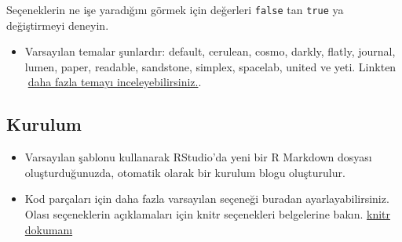 \documentclass[
  oneside]{book}
\newenvironment{Shaded}{\begin{snugshade}}{\end{snugshade}}
\newcommand{\AttributeTok}[1]{\textcolor[rgb]{0.13,0.29,0.53}{#1}}
\newcommand{\ConstantTok}[1]{\textcolor[rgb]{0.56,0.35,0.01}{#1}}
\newcommand{\DecValTok}[1]{\textcolor[rgb]{0.00,0.00,0.81}{#1}}
\newcommand{\FunctionTok}[1]{\textcolor[rgb]{0.13,0.29,0.53}{\textbf{#1}}}
\newcommand{\NormalTok}[1]{#1}
\newcommand{\SpecialCharTok}[1]{\textcolor[rgb]{0.81,0.36,0.00}{\textbf{#1}}}
\newcommand{\StringTok}[1]{\textcolor[rgb]{0.31,0.60,0.02}{#1}}
\providecommand{\tightlist}{%
  \setlength{\itemsep}{0pt}\setlength{\parskip}{0pt}}
\begin{document}
\begin{info}
Seçeneklerin ne işe yaradığını görmek için değerleri \texttt{false} tan \texttt{true} ya değiştirmeyi deneyin.

\end{info}

\begin{itemize}
\tightlist
\item
  Varsayılan temalar şunlardır: default, cerulean, cosmo, darkly, flatly, journal, lumen, paper, readable, sandstone, simplex, spacelab, united ve yeti. Linkten 🔗\href{https://rpubs.com/ranydc/rmarkdown_themes}{daha fazla temayı inceleyebilirsiniz.}.
\end{itemize}

\hypertarget{kurulum}{%
\subsection{Kurulum}\label{kurulum}}

\begin{itemize}
\tightlist
\item
  Varsayılan şablonu kullanarak RStudio'da yeni bir R Markdown dosyası oluşturduğunuzda, otomatik olarak bir kurulum blogu oluşturulur.
\end{itemize}

\begin{Shaded}
\end{Shaded}

\begin{itemize}
\tightlist
\item
  Kod parçaları için daha fazla varsayılan seçeneği buradan ayarlayabilirsiniz. Olası seçeneklerin açıklamaları için knitr seçenekleri belgelerine bakın. \href{https://yihui.name/knitr/options/}{knitr dokumanı}
\end{itemize}

\begin{Shaded}
\end{Shaded}
\end{document}
